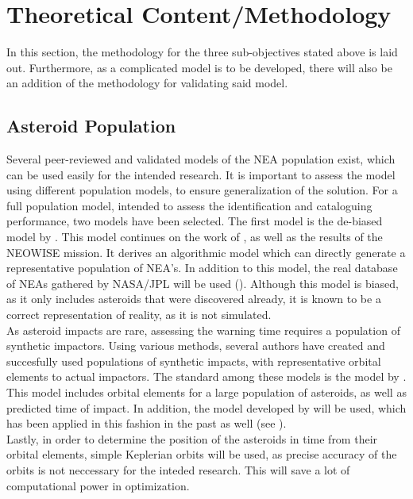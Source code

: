 \documentclass[12pt, english, NoHyper]{AE4010-template}
\begin{document}
\section{Theoretical Content/Methodology}
In this section, the methodology for the three sub-objectives stated above is laid out. Furthermore, as a complicated model is to be developed, there will also be an addition of the methodology for validating said model.

\subsection{Asteroid Population}
Several peer-reviewed and validated models of the NEA population exist, which can be used easily for the intended research. It is important to assess the model using different population models, to ensure generalization of the solution. For a full population model, intended to assess the identification and cataloguing performance, two models have been selected. The first model is the de-biased model by \cite{PopulationGranvik}. This model continues on the work of \cite{PopulationHarris}, as well as the results of the NEOWISE mission. It derives an algorithmic model which can directly generate a representative population of NEA's. In addition to this model, the real database of NEAs gathered by NASA/JPL will be used (\cite{CNEOSDatabase}). Although this model is biased, as it only includes asteroids that were discovered already, it is known to be a correct representation of reality, as it is not simulated.\\

As asteroid impacts are rare, assessing the warning time requires a population of synthetic impactors. Using various methods, several authors have created and succesfully used populations of synthetic impacts, with representative orbital elements to actual impactors. The standard among these models is the model by \cite{ChelseyPop}. This model includes orbital elements for a large population of asteroids, as well as predicted time of impact. In addition, the model developed by \cite{Flyeye} will be used, which has been applied in this fashion in the past as well (see \cite{ThesisOlga}).\\

Lastly, in order to determine the position of the asteroids in time from their orbital elements, simple Keplerian orbits will be used, as precise accuracy of the orbits is not neccessary for the inteded research. This will save a lot of computational power in optimization.
\end{document}
